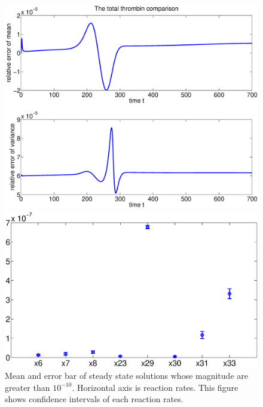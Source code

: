 \begin{figure}
  \begin{center}

  \includegraphics[width=5in]{figures/comp.eps}
\caption{The Difference of mean and variance of the total thrombin
obtained by SGPCM ($545$ points) and MC ($1000$ points). The figure
shows that the results of two methods are same under small
tolerance. %
 } \label{Fig:comp}

  \includegraphics[width=5in]{figures/steady.eps}
\caption{Mean and error bar of steady state solutions whose
magnitude are greater than $10^{-10}$. Horizontal axis is reaction
rates. This figure shows confidence intervals of each reaction
rates.} \label{Fig:steady}

  \end{center}
\end{figure}

